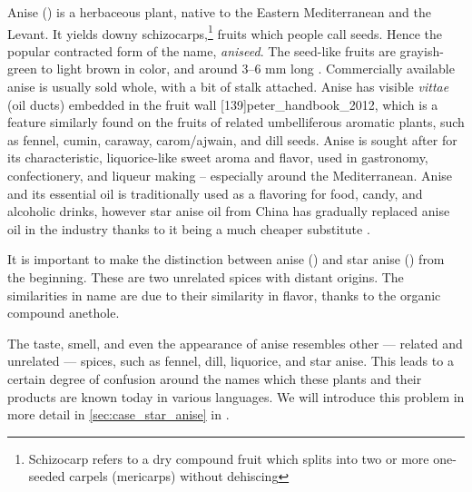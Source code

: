 
\noindent Anise () is a herbaceous plant, native to the Eastern Mediterranean and the Levant. It yields downy schizocarps,\footnote{Schizocarp refers to a dry compound fruit which splits into two or more one-seeded carpels (mericarps) without dehiscing} fruits which people call seeds. Hence the popular contracted form of the name, \textit{aniseed}. The seed-like fruits are grayish-green to light brown in color, and around 3--6 mm long \autocite[212]{van_wyk_culinary_2014}. Commercially available anise is usually sold whole, with a bit of stalk attached. Anise has visible \textit{vittae} (oil ducts) embedded in the fruit wall [139]{peter_handbook_2012}, which is a feature similarly found on the fruits of related umbelliferous aromatic plants, such as fennel, cumin, caraway, carom/ajwain, and dill seeds.
Anise is sought after for its characteristic, liquorice-like sweet aroma and flavor, used in gastronomy, confectionery, and liqueur making -- especially around the Mediterranean. 
Anise and its essential oil is traditionally used as a flavoring for food, candy, and alcoholic drinks, however star anise oil from China has gradually replaced anise oil in the industry thanks to it being a much cheaper substitute \autocite[212]{van_wyk_culinary_2014}. %


\begin{note}
It is important to make the distinction between anise () and star anise () from the beginning. These are two unrelated spices with distant origins. The similarities in name are due to their similarity in flavor, thanks to the organic compound anethole. 
\end{note}

The taste, smell, and even the appearance of anise resembles other --- related and unrelated --- spices, such as fennel, dill, liquorice, and star anise. This leads to a certain degree of confusion around the names which these plants and their products are known today in various languages. We will introduce this problem in more detail in \cref{sec:case_star_anise} in .

